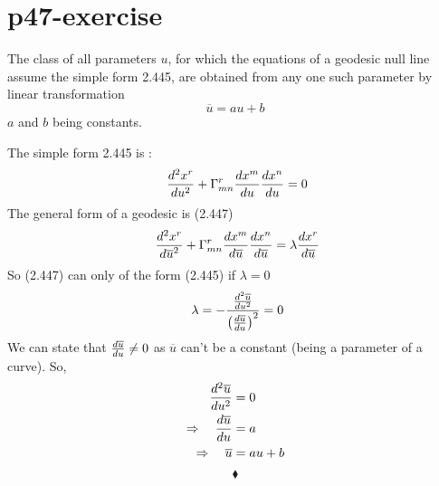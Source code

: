 \section{p47-exercise }
\begin{tcolorbox}
The class of all parameters $u$, for which the equations of a geodesic null line assume the simple form 2.445, are obtained from any one such parameter by linear transformation $$ \overline{u} = au + b$$ $a$ and $b$ being constants.
\end{tcolorbox}
The simple form 2.445 is :
\begin{align}
\  \dv[2]{x^r}{u} +\Gamma^r_{mn}\dv{x^m}{u}\dv{x^n}{u} = 0\\
\end{align}
The general form of a geodesic is (2.447) 
\begin{align}
\  \dv[2]{x^r}{\overline{u}} +\Gamma^r_{mn}\dv{x^m}{\overline{u}}\dv{x^n}{\overline{u}} = \lambda \dv{x^r}{\overline{u}}\\
\end{align}
So (2.447) can only of the form (2.445) if $\lambda = 0$
\begin{align}
\   \lambda  = - \frac{\dv[2]{\overline{u}}{u}}{\left( \dv{\overline{u}}{u}\right)^2} = 0\\
\end{align}
We can state that $\dv{\overline{u}}{u}\ne 0$ as $\overline{u}$ can't be a constant (being a parameter of a curve). So,
\begin{align}
\dv[2]{\overline{u}}{u}&=0\\
\Rightarrow \quad \dv{\overline{u}}{u}&=a\\
\Rightarrow \quad \overline{u}&=au +b
\end{align}
$$\blacklozenge$$
\newpage

